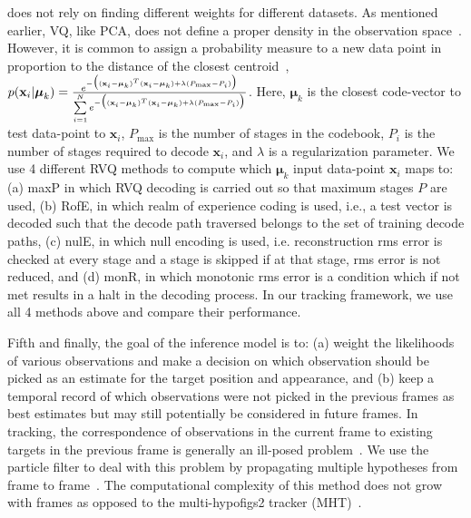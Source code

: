 \documentclass{article}
\begin{document}
does not rely on finding different weights for different datasets.  As mentioned earlier, VQ, like PCA, does not define a proper density in the observation space~\cite{1999_JNL_Gaussian_roweis}.  However, it is common to assign a probability measure to a new data point in proportion to the distance of the closest centroid~\cite{1999_JNL_Gaussian_roweis}, $p(\mathbf{x}_i|\boldsymbol\mu_k) = \frac{e^{-\big((\mathbf{x}_i-\boldsymbol\mu_k)^T(\mathbf{x}_i-\boldsymbol\mu_k) + \lambda({P_{\textrm{max}}-P_i})\big)}} {\sum\limits_{i=1}^N e^{-\big((\mathbf{x}_i-\boldsymbol\mu_k)^T(\mathbf{x}_i-\boldsymbol\mu_k) + \lambda({P_{\textrm{max}}-P_i})\big)}}$.  Here, $\boldsymbol\mu_k$ is the closest code-vector to test data-point to $\mathbf{x}_i$,  $P_{\textrm{max}}$ is the number of stages in the codebook, $P_i$ is the number of stages required to decode $\mathbf{x}_i$, and $\lambda$ is a regularization parameter.  We use 4 different RVQ methods to compute which $\boldsymbol \mu_k$ input data-point $\mathbf{x}_i$ maps to: (a) maxP in which RVQ decoding is carried out so that maximum stages $P$ are used, (b) RofE, in which realm of experience coding is used, i.e., a test vector is decoded such that the decode path traversed belongs to the set of training decode paths, (c) nulE, in which null encoding is used, i.e. reconstruction rms error is checked at every stage and a stage is skipped if at that stage, rms error is not reduced, and (d) monR, in which monotonic rms error is a condition which if not met results in a halt in the decoding  process.  In our tracking framework, we use all 4 methods above and compare their performance. 

Fifth and finally, the goal of the inference model is to: (a) weight the likelihoods of various observations and make a decision on which observation should be picked as an estimate for the target position and appearance, and (b) keep a temporal record of which observations were not picked in the previous frames as best estimates but may still potentially be considered in future frames.  In tracking, the correspondence of observations in the current frame to existing targets in the previous frame is generally an ill-posed problem~\cite{2005_CNF_TRK_Yang}.  We use the particle filter to deal with this problem by propagating multiple hypotheses from frame to frame~\cite{1998_JNL_Condensation_IsardBlake}.  The computational complexity of this method does not grow with frames as opposed to the multi-hypofigs2 tracker (MHT)~\cite{1993_JNL_SURVEYcorresp_Cox}.
\end{document}
